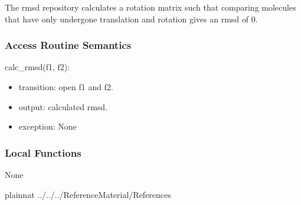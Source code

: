 \documentclass[12pt, titlepage]{article}
\begin{document}
The rmsd repository calculates a rotation matrix such that comparing molecules 
that have only undergone translation and rotation gives an rmsd of 0.

\subsubsection{Access Routine Semantics}

\noindent calc\_rmsd(f1, f2):
\begin{itemize}
	\item transition: open f1 and f2.
	\item output: calculated rmsd.
	\item exception: None
\end{itemize}

\subsubsection{Local Functions}

None


 {plainnat}
 {../../../ReferenceMaterial/References}

\end{document}

